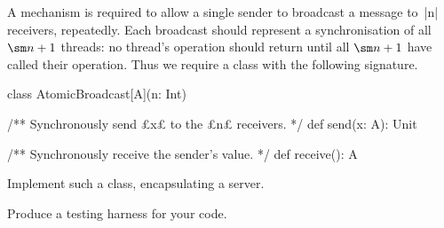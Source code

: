 \begin{questionS}
A mechanism is required to allow a single sender to broadcast a message to~|n|
receivers, repeatedly.  Each broadcast should represent a synchronisation of
all $\sm n + 1$ threads: no thread's operation should return until all $\sm
n+1$ have called their operation.  Thus we require a class with the following
signature.
%
\begin{scala}
class AtomicBroadcast[A](n: Int){
  /** Synchronously send £x£ to the £n£ receivers. */
  def send(x: A): Unit

  /** Synchronously receive the sender's value. */
  def receive(): A 
}
\end{scala}
%
Implement such a class, encapsulating a server.

Produce a testing harness for your code.
\end{questionS}


